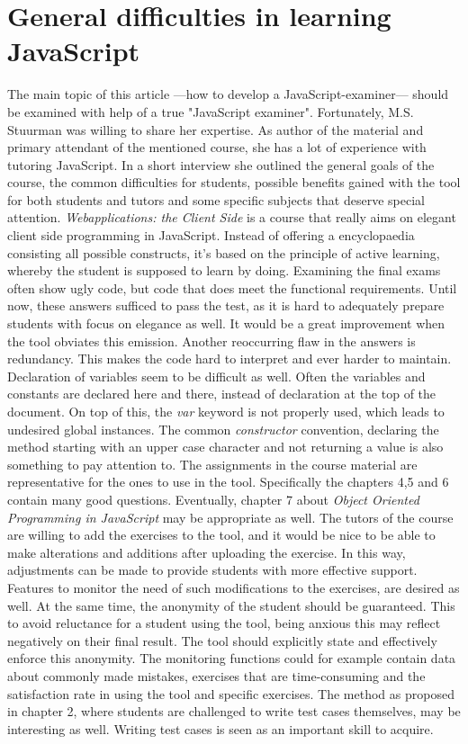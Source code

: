 \documentclass{article}
\begin{document}
\section{General difficulties in learning JavaScript} 
The main topic of this article ---how to develop a JavaScript-examiner--- should be 
examined with help of a true  "JavaScript examiner". Fortunately, 
M.S. Stuurman was willing to share her expertise. As author of the
material and primary attendant of the mentioned course, she has a lot of
experience with tutoring JavaScript.  In a short interview she outlined the
general goals of the course, the common difficulties for students, possible 
benefits gained with the tool for both students and tutors and some specific 
subjects that deserve special attention.\newline
{\em Webapplications: the Client Side} is a course that really aims on elegant 
client side programming in JavaScript. Instead of offering a encyclopaedia
consisting all possible constructs, it's based on the principle of active
learning, whereby the student is supposed to learn by doing. \newline
Examining the final exams often show ugly code, but code that does meet 
the functional requirements. Until now, these answers sufficed to pass the test,
as it is hard to adequately prepare students with focus on elegance as well. It
would be a great improvement when the tool obviates this emission. Another 
reoccurring flaw in the answers is redundancy. This makes the code hard
to interpret and ever harder to maintain. Declaration of variables seem to be
difficult as well. Often the variables and constants are declared here and 
there, instead of
declaration at the top of the document. On top of this, the {\em var} keyword 
is not properly used, which leads to undesired global instances. The common
{\em constructor} convention, declaring the method starting with an upper case
character and not returning a value is also something to pay attention to. \newline
The assignments in the course material are representative for the ones to use 
in the tool. Specifically the chapters 4,5 and 6 contain many good questions. 
Eventually, chapter 7 about {\em Object Oriented Programming in JavaScript} may
be appropriate as well. 
The tutors of the course are willing to add the exercises to the tool, and it 
would be nice to be able to make alterations and additions after uploading the 
exercise. In this way, adjustments can be made to provide students with more
effective support. Features to monitor the need of such modifications to the 
exercises, are desired as well. At the same time, the anonymity of the student
should be guaranteed. This to avoid reluctance for a student using the tool, 
being anxious this may reflect negatively on their final result. The tool should
explicitly state and effectively enforce this anonymity. The monitoring
functions could for example contain data about commonly made mistakes,
exercises that are time-consuming and the satisfaction rate in using the tool
and specific exercises. The method as proposed in chapter 2, where students are
challenged to write test cases themselves, may be interesting as well. Writing
test cases is seen as an important skill to acquire. 
\end{document}

